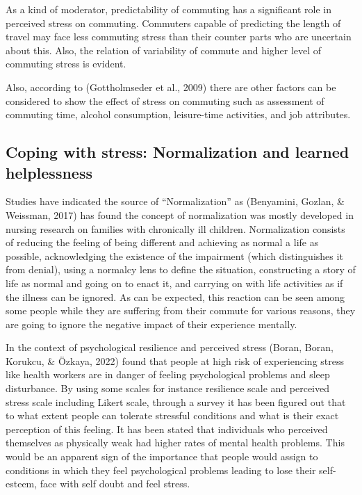 \documentclass[
11pt, %
oneside, %
english, %
singlespacing, %
]{macthesis} %
\begin{document}
As a kind of moderator, predictability of commuting has a significant role in perceived stress on commuting. Commuters capable of predicting the length of travel may face less commuting stress than their counter parts who are uncertain about this. Also, the relation of variability of commute and higher level of commuting stress is evident.

Also, according to (Gottholmseder et al., 2009) there are other factors can be considered to show the effect of stress on commuting such as assessment of commuting time, alcohol consumption, leisure-time activities, and job attributes.

\hypertarget{coping-with-stress-normalization-and-learned-helplessness}{%
\subsection{Coping with stress: Normalization and learned helplessness}\label{coping-with-stress-normalization-and-learned-helplessness}}

Studies have indicated the source of ``Normalization'' as (Benyamini, Gozlan, \& Weissman, 2017) has found the concept of normalization was mostly developed in nursing research on families with chronically ill children. Normalization consists of reducing the feeling of being different and achieving as normal a life as possible, acknowledging the existence of the impairment (which distinguishes it from denial), using a normalcy lens to define the situation, constructing a story of life as normal and going on to enact it, and carrying on with life activities as if the illness can be ignored. As can be expected, this reaction can be seen among some people while they are suffering from their commute for various reasons, they are going to ignore the negative impact of their experience mentally.

In the context of psychological resilience and perceived stress (Boran, Boran, Korukcu, \& Özkaya, 2022) found that people at high risk of experiencing stress like health workers are in danger of feeling psychological problems and sleep disturbance. By using some scales for instance resilience scale and perceived stress scale including Likert scale, through a survey it has been figured out that to what extent people can tolerate stressful conditions and what is their exact perception of this feeling. It has been stated that individuals who perceived themselves as physically weak had higher rates of mental health problems. This would be an apparent sign of the importance that people would assign to conditions in which they feel psychological problems leading to lose their self-esteem, face with self doubt and feel stress.
\end{document}
